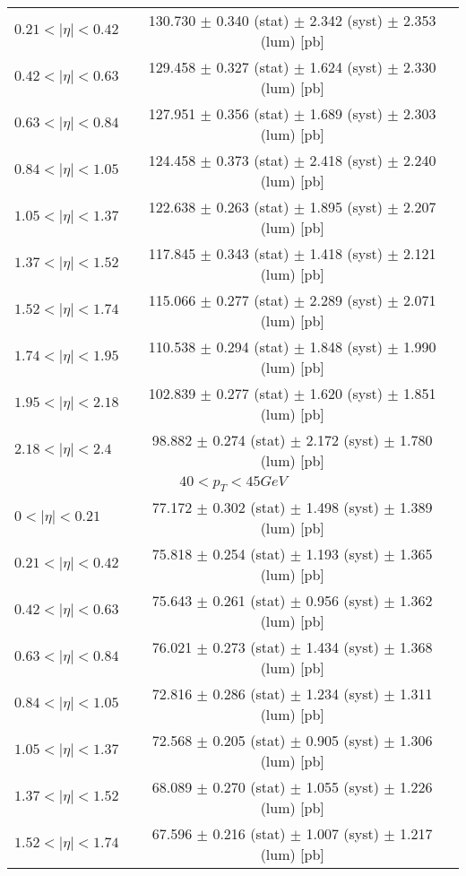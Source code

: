 \begin{tabular}{lc}
$0.21 < |\eta| <0.42$          & 130.730 $\pm$ 0.340 (stat) $\pm$ 2.342 (syst) $\pm$ 2.353 (lum) [pb]  \\
$0.42 < |\eta| <0.63$          & 129.458 $\pm$ 0.327 (stat) $\pm$ 1.624 (syst) $\pm$ 2.330 (lum) [pb]  \\
$0.63 < |\eta| <0.84$          & 127.951 $\pm$ 0.356 (stat) $\pm$ 1.689 (syst) $\pm$ 2.303 (lum) [pb]  \\
$0.84 < |\eta| <1.05$          & 124.458 $\pm$ 0.373 (stat) $\pm$ 2.418 (syst) $\pm$ 2.240 (lum) [pb]  \\
$1.05 < |\eta| <1.37$          & 122.638 $\pm$ 0.263 (stat) $\pm$ 1.895 (syst) $\pm$ 2.207 (lum) [pb]  \\
$1.37 < |\eta| <1.52$          & 117.845 $\pm$ 0.343 (stat) $\pm$ 1.418 (syst) $\pm$ 2.121 (lum) [pb]  \\
$1.52 < |\eta| <1.74$          & 115.066 $\pm$ 0.277 (stat) $\pm$ 2.289 (syst) $\pm$ 2.071 (lum) [pb]  \\
$1.74 < |\eta| <1.95$          & 110.538 $\pm$ 0.294 (stat) $\pm$ 1.848 (syst) $\pm$ 1.990 (lum) [pb]  \\
$1.95 < |\eta| <2.18$          & 102.839 $\pm$ 0.277 (stat) $\pm$ 1.620 (syst) $\pm$ 1.851 (lum) [pb]  \\
$2.18 < |\eta| <2.4$           & 98.882 $\pm$ 0.274 (stat) $\pm$ 2.172 (syst) $\pm$ 1.780 (lum) [pb]  \\
\hline
\multicolumn{2}{c}{$40 < p_{T} < 45 GeV$} \\
\hline
$0 < |\eta| <0.21$             & 77.172 $\pm$ 0.302 (stat) $\pm$ 1.498 (syst) $\pm$ 1.389 (lum) [pb]  \\
$0.21 < |\eta| <0.42$          & 75.818 $\pm$ 0.254 (stat) $\pm$ 1.193 (syst) $\pm$ 1.365 (lum) [pb]  \\
$0.42 < |\eta| <0.63$          & 75.643 $\pm$ 0.261 (stat) $\pm$ 0.956 (syst) $\pm$ 1.362 (lum) [pb]  \\
$0.63 < |\eta| <0.84$          & 76.021 $\pm$ 0.273 (stat) $\pm$ 1.434 (syst) $\pm$ 1.368 (lum) [pb]  \\
$0.84 < |\eta| <1.05$          & 72.816 $\pm$ 0.286 (stat) $\pm$ 1.234 (syst) $\pm$ 1.311 (lum) [pb]  \\
$1.05 < |\eta| <1.37$          & 72.568 $\pm$ 0.205 (stat) $\pm$ 0.905 (syst) $\pm$ 1.306 (lum) [pb]  \\
$1.37 < |\eta| <1.52$          & 68.089 $\pm$ 0.270 (stat) $\pm$ 1.055 (syst) $\pm$ 1.226 (lum) [pb]  \\
$1.52 < |\eta| <1.74$          & 67.596 $\pm$ 0.216 (stat) $\pm$ 1.007 (syst) $\pm$ 1.217 (lum) [pb]  \\

\end{tabular}
